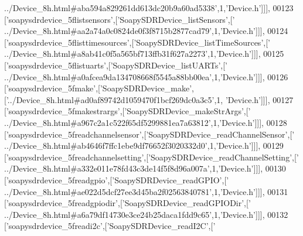 \begin{DoxyCode}
{      ../Device\_8h.html#aba594a829261dd613dc20b9a60ad5338'},1,\textcolor{stringliteral}{'Device.h'}]]],
00123   [\textcolor{stringliteral}{'soapysdrdevice\_5flistsensors'},[\textcolor{stringliteral}{'SoapySDRDevice\_listSensors'},[\textcolor{stringliteral}{'
      ../Device\_8h.html#aa2a74a0c0824de0f3f8715b2877cad79'},1,\textcolor{stringliteral}{'Device.h'}]]],
00124   [\textcolor{stringliteral}{'soapysdrdevice\_5flisttimesources'},[\textcolor{stringliteral}{'SoapySDRDevice\_listTimeSources'},[\textcolor{stringliteral}{'
      ../Device\_8h.html#a8ab41c0f5a565bf713ffb31f627a2273'},1,\textcolor{stringliteral}{'Device.h'}]]],
00125   [\textcolor{stringliteral}{'soapysdrdevice\_5flistuarts'},[\textcolor{stringliteral}{'SoapySDRDevice\_listUARTs'},[\textcolor{stringliteral}{'
      ../Device\_8h.html#a0afcea9da134708668f5545a88bb00ea'},1,\textcolor{stringliteral}{'Device.h'}]]],
00126   [\textcolor{stringliteral}{'soapysdrdevice\_5fmake'},[\textcolor{stringliteral}{'SoapySDRDevice\_make'},[\textcolor{stringliteral}{'../Device\_8h.html#ad0af89742d1059470f1bcf269dc0a3c5'},1,\textcolor{stringliteral}{
      'Device.h'}]]],
00127   [\textcolor{stringliteral}{'soapysdrdevice\_5fmakestrargs'},[\textcolor{stringliteral}{'SoapySDRDevice\_makeStrArgs'},[\textcolor{stringliteral}{'
      ../Device\_8h.html#a967c2a1c522f65df5299881ea7a63812'},1,\textcolor{stringliteral}{'Device.h'}]]],
00128   [\textcolor{stringliteral}{'soapysdrdevice\_5freadchannelsensor'},[\textcolor{stringliteral}{'SoapySDRDevice\_readChannelSensor'},[\textcolor{stringliteral}{'
      ../Device\_8h.html#ab4646f7ffc1ebe9df76652f3020332d0'},1,\textcolor{stringliteral}{'Device.h'}]]],
00129   [\textcolor{stringliteral}{'soapysdrdevice\_5freadchannelsetting'},[\textcolor{stringliteral}{'SoapySDRDevice\_readChannelSetting'},[\textcolor{stringliteral}{'
      ../Device\_8h.html#a332e011e78fd43c3de14f5f8d96a007a'},1,\textcolor{stringliteral}{'Device.h'}]]],
00130   [\textcolor{stringliteral}{'soapysdrdevice\_5freadgpio'},[\textcolor{stringliteral}{'SoapySDRDevice\_readGPIO'},[\textcolor{stringliteral}{'
      ../Device\_8h.html#ae022d5dcf27ee3d45ba2f02563840781'},1,\textcolor{stringliteral}{'Device.h'}]]],
00131   [\textcolor{stringliteral}{'soapysdrdevice\_5freadgpiodir'},[\textcolor{stringliteral}{'SoapySDRDevice\_readGPIODir'},[\textcolor{stringliteral}{'
      ../Device\_8h.html#a6a79df14730e3ce24b25daca1fdd9c65'},1,\textcolor{stringliteral}{'Device.h'}]]],
00132   [\textcolor{stringliteral}{'soapysdrdevice\_5freadi2c'},[\textcolor{stringliteral}{'SoapySDRDevice\_readI2C'},[\textcolor{stringliteral}{'
}
\end{DoxyCode}
